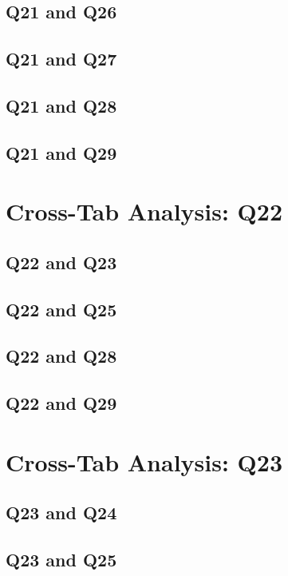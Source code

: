 \documentclass{report}
\begin{document}
\section{Q21 and Q26}\clearpage
\section{Q21 and Q27}\clearpage
\section{Q21 and Q28}\clearpage
\section{Q21 and Q29}\clearpage

\chapter{Cross-Tab Analysis: Q22}

\section{Q22 and Q23}\clearpage
\section{Q22 and Q25}\clearpage
\section{Q22 and Q28}\clearpage
\section{Q22 and Q29}\clearpage

\chapter{Cross-Tab Analysis: Q23}

\section{Q23 and Q24}\clearpage
\section{Q23 and Q25}\clearpage
\end{document}

